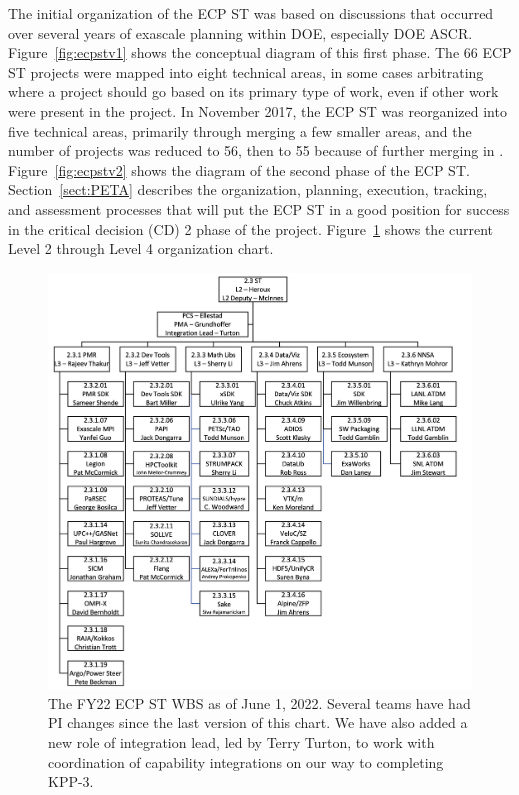 The initial organization of the ECP ST was based on discussions that occurred over several years of exascale planning within DOE, especially DOE ASCR.  Figure~\ref{fig:ecpstv1}  shows the conceptual diagram of this first phase.  The 66 ECP ST projects were mapped into eight technical areas, in some cases arbitrating where a project should go based on its primary type of work, even if other work were present in the project.  In November 2017, the ECP ST was reorganized into five technical areas, primarily through merging a few smaller areas, and the number of projects was reduced to 56, then to 55 because of further merging in \ecosystem.  Figure~\ref{fig:ecpstv2} shows the diagram of the second phase of the ECP ST.  Section~\ref{sect:PETA} describes the organization, planning, execution, tracking, and assessment processes that will put the ECP ST in a good position for success in the critical decision (CD) 2 phase of the project.  Figure~\ref{fig:wbs-FY22} shows the current Level 2 through Level 4 organization chart.

\begin{figure}
	\centering
	\includegraphics[width=0.9\linewidth]{STFY22WBS}
	\caption{\label{fig:wbs-FY22} The FY22 ECP ST WBS as of June 1, 2022.  Several teams have had PI changes since the last version of this chart.  We have also added a new role of integration lead, led by Terry Turton, to work with coordination of capability integrations on our way to completing KPP-3.}
    \protect{}
\end{figure}

